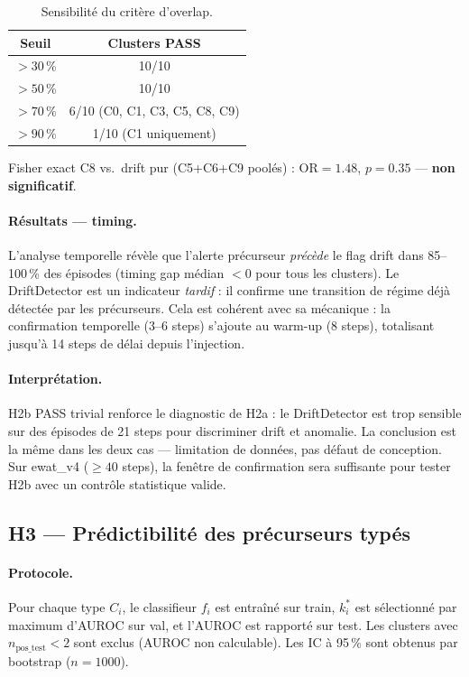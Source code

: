 \begin{table}[h]
\centering
\caption{Sensibilité du critère d'overlap.}
\label{tab:h2b_sensitivity}
\begin{tabular}{cc}
\toprule
\textbf{Seuil} & \textbf{Clusters PASS} \\
\midrule
$> 30$\,\% & 10/10 \\
$> 50$\,\% & 10/10 \\
$> 70$\,\% & 6/10 (C0, C1, C3, C5, C8, C9) \\
$> 90$\,\% & 1/10 (C1 uniquement) \\
\bottomrule
\end{tabular}
\end{table}

Fisher exact C8 vs.\ drift pur (C5+C6+C9 poolés) :
$\text{OR} = 1.48$, $p = 0.35$ --- \textbf{non significatif}.

\paragraph{Résultats --- timing.}
L'analyse temporelle révèle que l'alerte précurseur \emph{précède} le flag drift dans
85--100\,\% des épisodes (timing gap médian $< 0$ pour tous les clusters).
Le DriftDetector est un indicateur \emph{tardif} : il confirme une transition de régime
déjà détectée par les précurseurs. Cela est cohérent avec sa mécanique : la confirmation
temporelle (3--6 steps) s'ajoute au warm-up (8 steps), totalisant jusqu'à 14 steps de
délai depuis l'injection.

\paragraph{Interprétation.}
H2b PASS trivial renforce le diagnostic de H2a : le DriftDetector est trop sensible sur
des épisodes de 21 steps pour discriminer drift et anomalie. La conclusion est la même
dans les deux cas --- limitation de données, pas défaut de conception. Sur ewat\_v4
($\geq 40$ steps), la fenêtre de confirmation sera suffisante pour tester H2b
avec un contrôle statistique valide.

\subsection{H3 --- Prédictibilité des précurseurs typés}
\label{sec:h3}

\paragraph{Protocole.}
Pour chaque type $C_i$, le classifieur $f_i$ est entraîné sur train, $k^*_i$ est sélectionné
par maximum d'AUROC sur val, et l'AUROC est rapporté sur test. Les clusters avec
$n_\text{pos\_test} < 2$ sont exclus (AUROC non calculable).
Les IC à 95\,\% sont obtenus par bootstrap ($n = 1000$).


